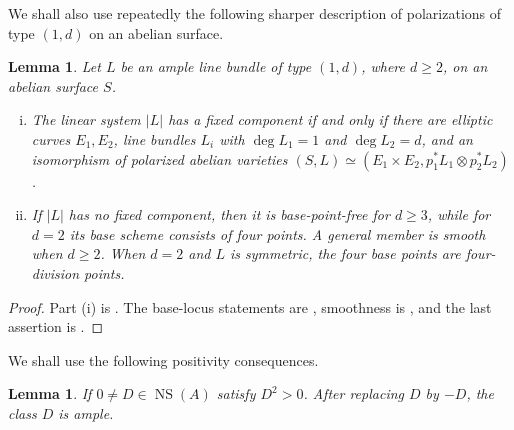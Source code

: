 \documentclass[12pt]{amsart}
\numberwithin{equation}{section}
\newtheorem{lemma}[theorem]{Lemma}
\theoremstyle{definition}
\theoremstyle{remark}
\newcommand{\NS}{\operatorname{NS}}
\begin{document}
We shall also use repeatedly the following sharper description of
polarizations of type $(1,d)$ on an abelian surface.

\begin{lemma}\label{lem:BL-1d}
Let $L$ be an ample line bundle of type $(1,d)$, where $d\geq2$, on an
abelian surface $S$.
\begin{enumerate}[(i)]
\item The linear system $|L|$ has a fixed component if and only if there
are elliptic curves $E_1,E_2$, line bundles $L_i$ with
$\deg L_1=1$ and $\deg L_2=d$, and an isomorphism of polarized abelian
varieties
$(S,L)\simeq(E_1\times E_2,p_1^*L_1\otimes p_2^*L_2)$.
\item If $|L|$ has no fixed component, then it is base-point-free for
$d\geq3$, while for $d=2$ its base scheme consists of four points.  A
general member is smooth when $d\geq2$.  When $d=2$ and $L$ is symmetric, the four base
points are four-division points.
\end{enumerate}
\end{lemma}

\begin{proof}
Part (i) is \cite[Lemma~10.1.1]{BL}.  The base-locus statements are
\cite[Lemma~10.1.2]{BL}, smoothness is
\cite[Proposition~10.1.3]{BL}, and the last assertion is
\cite[Example~10.1.4]{BL}.
\end{proof}



We shall use the following positivity consequences.
\begin{lemma}\label{lem:positive-is-ample}
If
$0\neq D\in\NS(A)$ satisfy $D^2>0$.  After replacing $D$ by $-D$, the
class $D$ is ample.
\end{lemma}
\end{document}
